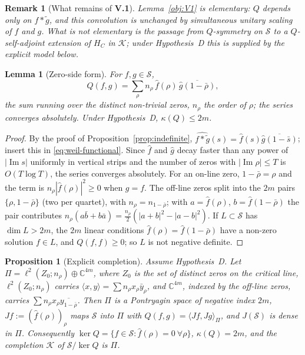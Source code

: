 \documentclass[11pt]{amsart}
\newtheorem{proposition}[theorem]{Proposition}
\newtheorem{lemma}[theorem]{Lemma}
\newtheorem{remark}[theorem]{Remark}
\renewcommand{\Im}{\operatorname{Im}}
\newcommand{\kap}{\kappa}
\newcommand{\Kcal}{\mathcal{K}}
\newcommand{\Scal}{\mathcal{S}}
\begin{document}
\begin{remark}[What remains of \textbf{V.1}]\label{rem:V1-nontrivial}
Lemma~\ref{obj:V1} is elementary: $Q$ depends only on $f*\tilde g$, and this convolution is
unchanged by simultaneous unitary scaling of $f$ and $g$.  What is not elementary is the
passage from $Q$-symmetry on $\Scal$ to a $Q$-self-adjoint extension of $H_C$ in $\Kcal$;
under Hypothesis~D this is supplied by the explicit model below.
\end{remark}

\begin{lemma}[Zero-side form]\label{lem:zero-side}
For $f,g\in\Scal$,
\[
  Q(f,g)=\sum_{\rho}n_\rho\,\hat f(\rho)\,\overline{\hat g(1-\bar\rho)},
\]
the sum running over the distinct non-trivial zeros, $n_\rho$ the order of $\rho$; the series
converges absolutely.  Under Hypothesis~D, $\kap(Q)\le2m$.
\end{lemma}

\begin{proof}
By the proof of Proposition~\ref{prop:indefinite}, $\widehat{f*\tilde g}(s)=\hat f(s)
\overline{\hat g(1-\bar s)}$; insert this in \eqref{eq:weil-functional}.  Since $\hat f$ and
$\hat g$ decay faster than any power of $|\Im s|$ uniformly in vertical strips and the number of
zeros with $|\Im\rho|\le T$ is $O(T\log T)$, the series converges absolutely.  For an on-line
zero, $1-\bar\rho=\rho$ and the term is $n_\rho|\hat f(\rho)|^2\ge0$ when $g=f$.  The off-line
zeros split into the $2m$ pairs $\{\rho,1-\bar\rho\}$ (two per quartet), with $n_\rho=n_{1-\bar\rho}$;
with $a=\hat f(\rho)$, $b=\hat f(1-\bar\rho)$ the pair contributes
$n_\rho(a\bar b+b\bar a)=\tfrac{n_\rho}{2}(|a+b|^2-|a-b|^2)$.  If $L\subset\Scal$ has
$\dim L>2m$, the $2m$ linear conditions $\hat f(\rho)=\hat f(1-\bar\rho)$ have a non-zero
solution $f\in L$, and $Q(f,f)\ge0$; so $L$ is not negative definite.
\end{proof}

\begin{proposition}[Explicit completion]\label{prop:model}
Assume Hypothesis~D.  Let $\Pi=\ell^2(Z_0;n_\rho)\oplus\mathbb C^{4m}$, where $Z_0$ is the set of
distinct zeros on the critical line, $\ell^2(Z_0;n_\rho)$ carries
$\langle x,y\rangle=\sum n_\rho x_\rho\bar y_\rho$, and $\mathbb C^{4m}$, indexed by the off-line
zeros, carries $\sum n_\rho x_\rho\overline{y_{1-\bar\rho}}$.  Then $\Pi$ is a Pontryagin space of
negative index $2m$, $Jf:=(\hat f(\rho))_\rho$ maps $\Scal$ into $\Pi$ with $Q(f,g)=\langle
Jf,Jg\rangle_\Pi$, and $J(\Scal)$ is dense in $\Pi$.  Consequently
$\ker Q=\{f\in\Scal:\hat f(\rho)=0\ \forall\rho\}$, $\kap(Q)=2m$, and the completion $\Kcal$ of
$\Scal/\ker Q$ is $\Pi$.
\end{proposition}
\end{document}
